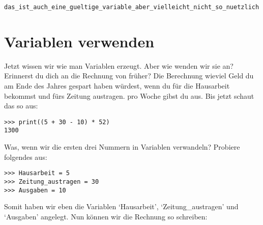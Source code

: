 \begin{Verbatim}[frame=single]
das_ist_auch_eine_gueltige_variable_aber_vielleicht_nicht_so_nuetzlich
\end{Verbatim}

\section{Variablen verwenden}

Jetzt wissen wir wie man Variablen erzeugt. Aber wie wenden wir sie an? Erinnerst du dich an die Rechnung von früher? Die Berechnung wieviel Geld du am Ende des Jahres gespart haben würdest, wenn du  für die Hausarbeit bekommst und  fürs Zeitung austragen.  pro Woche gibst du aus. Bis jetzt schaut das so aus:

\begin{Verbatim}[frame=single]
>>> print((5 + 30 - 10) * 52)
1300
\end{Verbatim}

\noindent
Was, wenn wir die ersten drei Nummern in Variablen verwandeln? Probiere folgendes aus:

\begin{Verbatim}[frame=single]
>>> Hausarbeit = 5
>>> Zeitung_austragen = 30
>>> Ausgaben = 10
\end{Verbatim}

\noindent
Somit haben wir eben die Variablen `Hausarbeit', `Zeitung\_austragen' und `Ausgaben' angelegt. Nun können wir die Rechnung so schreiben:

